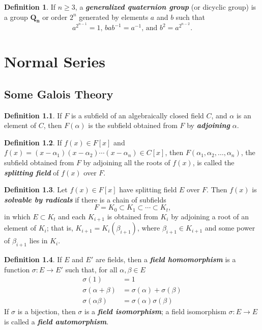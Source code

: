 \documentclass[12pt]{report}
\theoremstyle{definition}
\newtheorem*{definition}{Definition}
\newcommand{\term}[1]{\textbf{\textit{#1}}}
\begin{document}
\begin{definition}
	If $n\geq 3$, a \term{generalized quaternion group} (or dicyclic group) is a group $\mathbf{Q_n}$ or order $2^n$ generated by elements $a$ and $b$ such that
	\[ a^{2^{n-1}}=1 \text{, } bab^{-1}=a^{-1} \text{, and } b^2=a^{2^{n-2}} \text{.} \]
\end{definition}

\chapter{Normal Series}

\section{Some Galois Theory}
\begin{definition}
	If $F$ is a subfield of an algebraically closed field $C$, and $\alpha$ is an element of $C$, then $F(\alpha)$ is the subfield obtained from $F$ by \term{adjoining} $\alpha$.
\end{definition}

\begin{definition}
	If $f(x)\in F[x]$ and $f(x) = (x-\alpha_1)(x-\alpha_2)\cdots(x-\alpha_n)\in C[x]$, then $F(\alpha_1, \alpha_2, \ldots, \alpha_n)$, the subfield obtained from $F$ by adjoining all the roots of $f(x)$, is called the \term{splitting field} of $f(x)$ over $F$.
\end{definition}

\begin{definition}
	Let $f(x)\in F[x]$ have splitting field $E$ over $F$. Then $f(x)$ is \term{solvable by radicals} if there is a chain of subfields
	\[ F = K_0\subset K_1\subset\cdots\subset K_t\text{,}\]
	in which $E\subset K_t$ and each $K_{i+1}$ is obtained from $K_i$ by adjoining a root of an element of $K_i$; that is, $K_{i+1}=K_i(\beta_{i+1})$, where $\beta_{i+1}\in K_{i+1}$ and some power of $\beta_{i+1}$ lies in $K_i$.
\end{definition}

\begin{definition}
	If $E$ and $E'$ are fields, then a \term{field homomorphism} is a function $\sigma:E\to E'$ such that, for all $\alpha,\beta\in E$
	\begin{align*}
		\sigma(1) &= 1 \\
		\sigma(\alpha+\beta) &= \sigma(\alpha)+\sigma(\beta) \\
		\sigma(\alpha\beta) &= \sigma(\alpha)\sigma(\beta)
	\end{align*}
	If $\sigma$ is a bijection, then $\sigma$ is a \term{field isomorphism}; a field isomorphism $\sigma:E\to E$ is called a \term{field automorphism}.
\end{definition}
\end{document}
